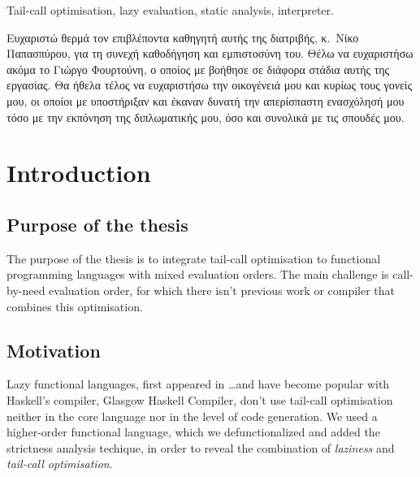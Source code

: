 \documentclass[diploma]{softlab-thesis}
\begin{document}
\begin{abstracten}
\begin{keywordsen}
Tail-call optimisation, lazy evaluation, static analysis, interpreter. 
\end{keywordsen}
\end{abstracten}



\begin{acknowledgementsgr}
Ευχαριστώ θερμά τον επιβλέποντα καθηγητή αυτής της διατριβής,
κ.~Νίκο Παπασπύρου, για τη συνεχή καθοδήγηση και εμπιστοσύνη
του. Θέλω να ευχαριστήσω ακόμα
το Γιώργο Φουρτούνη, ο οποίος με βοήθησε σε
διάφορα στάδια αυτής της εργασίας.  Θα ήθελα τέλος να ευχαριστήσω
την οικογένειά μου και κυρίως τους γονείς μου, οι οποίοι με
υποστήριξαν και έκαναν δυνατή την απερίσπαστη ενασχόλησή μου τόσο
με την εκπόνηση της διπλωματικής μου, όσο και συνολικά με τις
σπουδές μου.
\end{acknowledgementsgr}



\tableofcontents
\listoftables
\listoffigures



\mainmatter


\chapter{Introduction}

\section {Purpose of the thesis}
The purpose of the thesis is to integrate tail-call optimisation to
functional programming languages with mixed evaluation orders. The main
challenge is call-by-need evaluation order, for which there isn't previous 
work or compiler that combines this optimisation.

\section {Motivation}
Lazy functional languages, first appeared in \dots and have become popular
with Haskell's compiler, Glasgow Haskell Compiler, don't use tail-call optimisation 
neither in the core language nor in the level of code generation. We used 
a higher-order functional language, which we defunctionalized and added the 
strictness analysis techique, in order to reveal the combination of \textit{laziness}
and \textit{tail-call optimisation}. 
\end{document}
